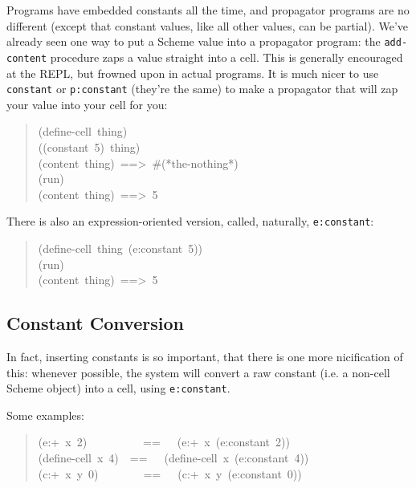 \documentclass[12pt,letterpaper,english]{article}
\begin{document}
Programs have embedded constants all the time, and propagator programs
are no different (except that constant values, like all other values,
can be partial).  We've already seen one way to put a Scheme value
into a propagator program: the \texttt{add-content} procedure zaps a value
straight into a cell.  This is generally encouraged at the REPL, but
frowned upon in actual programs.  It is much nicer to use \texttt{constant}
or \texttt{p:constant} (they're the same) to make a propagator that will
zap your value into your cell for you:
\begin{quote}{\ttfamily \raggedright \noindent
(define-cell~thing)~\\
((constant~5)~thing)~\\
(content~thing)~==>~{\#}(*the-nothing*)~\\
(run)~\\
(content~thing)~==>~5
}\end{quote}

There is also an expression-oriented version, called, naturally,
\texttt{e:constant}:
\begin{quote}{\ttfamily \raggedright \noindent
(define-cell~thing~(e:constant~5))~\\
(run)~\\
(content~thing)~==>~5
}\end{quote}



\hypertarget{constant-conversion}{}
\subsection{Constant Conversion}
\label{constant-conversion}

In fact, inserting constants is so important, that there is one more
nicification of this: whenever possible, the system will convert a raw
constant (i.e. a non-cell Scheme object) into a cell, using
\texttt{e:constant}.

Some examples:
\begin{quote}{\ttfamily \raggedright \noindent
(e:+~x~2)~~~~~~~~~~==~~~(e:+~x~(e:constant~2))~\\
(define-cell~x~4)~~==~~~(define-cell~x~(e:constant~4))~\\
(c:+~x~y~0)~~~~~~~~==~~~(c:+~x~y~(e:constant~0))
}\end{quote}


\end{document}
